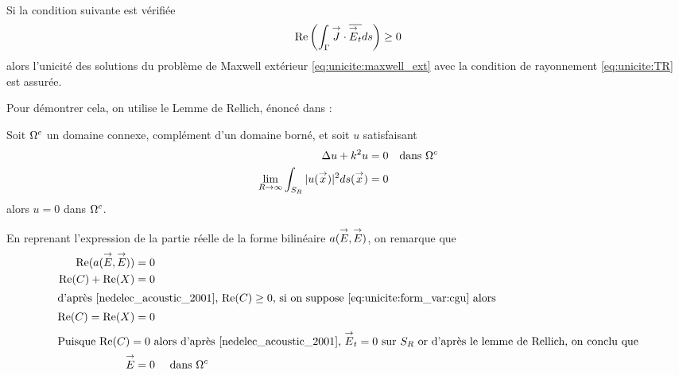 


  \begin{prop}~\\
    Si la condition suivante est vérifiée
    \begin{equation}
      \label{eq:unicite:form_var:cgu}
      \operatorname{Re}\left(\int_\Gamma {\overset{\rightarrow}{J}} \cdot {\overline{{\overset{\rightarrow}{E}}_t}} ds\right) \ge 0
    \end{equation}
    alors l'unicité des solutions du problème de Maxwell extérieur \eqref{eq:unicite:maxwell_ext} avec la condition de rayonnement \eqref{eq:unicite:TR} est assurée.
  \end{prop}

  Pour démontrer cela, on utilise le Lemme de Rellich, énoncé dans \cite[p.~74]{cessenat_mathematical_1996}:
  \begin{lemme}[Rellich]
    Soit \(\Omega^c\) un domaine connexe, complément d'un domaine borné, et soit \(u\) satisfaisant
    \begin{subequations}
      \begin{align}
        \Delta u + k^2 u = 0 & &\text{dans \(\Omega^c\)}
        \\
        \lim_{R\rightarrow\infty}\int_{S_R} |u({\overset{\rightarrow}{x}})|^2 ds({\overset{\rightarrow}{x}}) = 0
      \end{align}
    \end{subequations}
    alors \(u=0\) dans \(\Omega^c\).
  \end{lemme}

  En reprenant l'expression de la partie réelle de la forme bilinéaire \(a({\overset{\rightarrow}{E}},{\overset{\rightarrow}{E}})\), on remarque que
  \begin{align}
    \Re(a(\vE,\vE)) & = 0
    \\
    \Re(C) + \Re(X) & = 0
    \\ \intertext{d'après \cite[eq.~5.3.89]{nedelec_acoustic_2001}, \(\Re(C)\ge 0\), si on suppose \eqref{eq:unicite:form_var:cgu} alors } 
    \Re(C) = \Re(X) & = 0
    \\ \intertext{Puisque \(\Re(C) = 0\) alors d'après \cite[Théorème~5.3.5]{nedelec_acoustic_2001}, \(\vE_t = 0\) sur \(S_R\) or d'après le lemme de Rellich, on conclu que}
    \vE &= 0  &\text{ dans } \OO^c
  \end{align}

